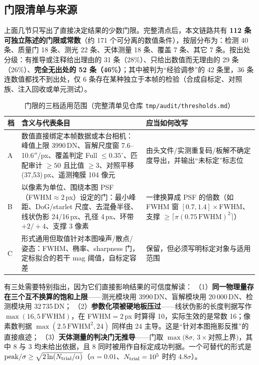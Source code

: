 \documentclass[11pt,a4paper]{ctexart}
\begin{document}
\subsection{门限清单与来源}\label{sec:gates}
上面几节只写出了直接决定结果的少数门限。完整清点后，本文链路共有 \textbf{112 条可独立陈述的门限或常数}（约 171 个可分离的数值条件），按层分布为：检测 40 条、质量门 18 条、测光 22 条、天体测量 18 条、覆盖 7 条、其它 7 条。按出处分级：有推导或注释给出理由的 31 条（28\%）、只给出数值而无理由的 29 条（26\%）、\textbf{完全无出处的 52 条（46\%）}；其中被判为“经验调参”的 42 条里，36 条连数值都找不到出处，仅 6 条存在某种独立于本帧的检验（合成自标定、对照族、注入回收或单元测试）。

\begin{table}[htbp]\centering\small
\caption{门限的三档适用范围（完整清单见仓库 \texttt{tmp/audit/thresholds.md}）}\label{tab:gates}
\begin{tabular}{@{}>{\raggedright\arraybackslash}p{}>{\raggedright\arraybackslash}p{}>{\raggedright\arraybackslash}p{}@{}}
\toprule
档 & 含义与代表条目 & 应当如何改写\\
\midrule
A & 数值直接绑定本帧数据或本台相机：峰值上限 3990\,DN、盲解尺度窗 7.6--10.6$''$/px、覆盖判定 Full $\le0.35^\circ$、匹配审计 $\ge50$ 且比值 $\ge3$、对照平移 (37,53)\,px、遥测掩膜 104 像元 & 由头文件/实测重复码/板解不确定度导出，并输出“未标定”标志位\\
B & 以像素为单位、围绕本图 PSF（FWHM$\approx2$\,px）设定的门：最小峰距、DoG/starlet 尺度、去混叠半径、线状伪影 24/16\,px、孔径 4\,px、环带 $+2/+4$、支撑 3 像素 & 一律换算成 PSF 的倍数（如 FWHM 窗 $[0.7,1.4]\times$FWHM、支撑 $\ge\lceil\pi(0.75\,\mathrm{FWHM})^2\rceil$）\\
C & 形式通用但取值针对本图噪声/散点/姿态：FWHM、椭率、sharpness 门，定标拟合的若干 mag 阈值，自标定容差 & 保留，但必须写明标定对象与适用范围\\
\bottomrule
\end{tabular}
\end{table}

\noindent 有三处需要特别指出，因为它们直接影响结果的可信度解读：
（1）\textbf{同一物理量存在三个互不换算的饱和上限}——测光模块用 3990\,DN、盲解模块用 20\,000\,DN、检测模块用 32\,735\,DN；
（2）\textbf{参数化项被硬地板压过}——线状伪影的长度判据写作 $\max(16,5\,\mathrm{FWHM})$，在 FWHM$=2$\,px 时算得 10，实际生效的是常数 16；像素数判据 $\max(2.5\,\mathrm{FWHM}^2,24)$ 同样由 24 主导。这是“针对本图拖影反推”的直接痕迹；
（3）\textbf{天体测量的判决门无推导}——门取 $\max(8\sigma,\,3\times$对照上界$)$，其中 8 与 3 均未给出依据，且 8 同时被用作自标定成功判据。一个可替代的形式是 $\mathrm{peak}/\sigma\ge\sqrt{2\ln(N_{\rm trial}/\alpha)}$（$\alpha=0.01$、$N_{\rm trial}=10^5$ 时约 $4.8\sigma$）。
\end{document}
